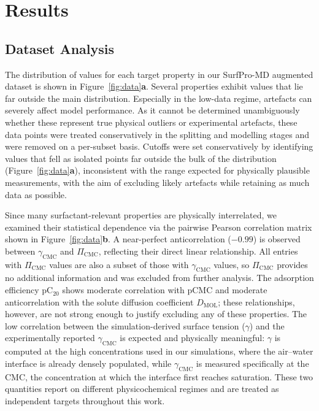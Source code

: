 \documentclass[11pt]{aime}
\begin{document}
\section{Results}
\label{results}

\subsection{Dataset Analysis}
\label{sec:results:dataset_analysis}

The distribution of values for each target property in our SurfPro-MD augmented dataset is shown in Figure~\ref{fig:data}\textbf{a}.
Several properties exhibit values that lie far outside the main distribution.
Especially in the low-data regime, artefacts can severely affect model performance.
As it cannot be determined unambiguously whether these represent true physical outliers or experimental artefacts, these data points were treated conservatively in the splitting and modelling stages and were removed on a per-subset basis.
Cutoffs were set conservatively by identifying values that fell as isolated points far outside the bulk of the distribution (Figure~\ref{fig:data}\textbf{a}), inconsistent with the range expected for physically plausible measurements, with the aim of excluding likely artefacts while retaining as much data as possible.

Since many surfactant-relevant properties are physically interrelated, we examined their statistical dependence via the pairwise Pearson correlation matrix shown in Figure~\ref{fig:data}\textbf{b}.
A near-perfect anticorrelation ($-0.99$) is observed between $\gamma_{\mathrm{CMC}}$ and $\Pi_{\mathrm{CMC}}$, reflecting their direct linear relationship.
All entries with $\Pi_{\mathrm{CMC}}$ values are also a subset of those with $\gamma_{\mathrm{CMC}}$ values, so $\Pi_{\mathrm{CMC}}$ provides no additional information and was excluded from further analysis.
The adsorption efficiency pC$_{20}$ shows moderate correlation with pCMC and moderate anticorrelation with the solute diffusion coefficient $D_{\mathrm{MOL}}$;
these relationships, however, are not strong enough to justify excluding any of these properties.
The low correlation between the simulation-derived surface tension ($\gamma$) and the experimentally reported $\gamma_{\mathrm{CMC}}$ is expected and physically meaningful: $\gamma$ is computed at the high concentrations used in our simulations, where the air--water interface is already densely populated, while $\gamma_{\mathrm{CMC}}$ is measured specifically at the CMC, the concentration at which the interface first reaches saturation.
These two quantities report on different physicochemical regimes and are treated as independent targets throughout this work.
\end{document}
